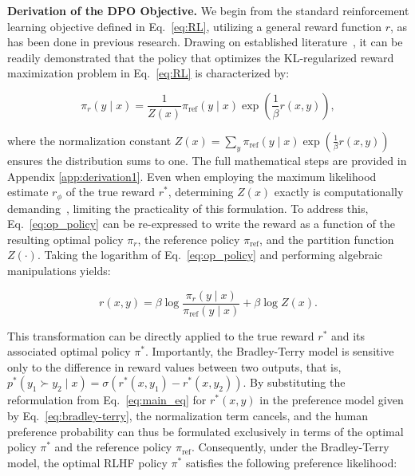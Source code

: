 \textbf{Derivation of the DPO Objective.} We begin from the standard reinforcement learning objective defined in Eq.~\ref{eq:RL}, utilizing a general reward function $r$, as has been done in previous research. Drawing on established literature~\citep{peters2007reinforcement, peng2019advantage, korbak2022reinforcement, go2023aligning}, it can be readily demonstrated that the policy that optimizes the KL-regularized reward maximization problem in Eq.~\ref{eq:RL} is characterized by:

\begin{equation}\label{eq:op_policy}
    \pi_r(y\mid x) = \frac{1}{Z(x)}\pi_\text{ref}(y\mid x)\exp\left(\frac{1}{\beta}r(x, y)\right),
\end{equation}

where the normalization constant $Z(x) =\sum_{y}\pi_\text{ref}(y\mid x)\exp\left(\frac{1}{\beta}r(x, y)\right)$ ensures the distribution sums to one. The full mathematical steps are provided in Appendix \ref{app:derivation1}. Even when employing the maximum likelihood estimate $r_\phi$ of the true reward $r^*$, determining $Z(x)$ exactly is computationally demanding~\citep{korbak2022reinforcement, go2023aligning}, limiting the practicality of this formulation. To address this, Eq.~\ref{eq:op_policy} can be re-expressed to write the reward as a function of the resulting optimal policy $\pi_r$, the reference policy $\pi_\text{ref}$, and the partition function $Z(\cdot)$. Taking the logarithm of Eq.~\ref{eq:op_policy} and performing algebraic manipulations yields:

\begin{equation}\label{eq:main_eq}
    r(x,y) =\beta \log \frac{\pi_r(y\mid x)}{\pi_\text{ref}(y\mid x)} + \beta \log Z(x).
\end{equation}

This transformation can be directly applied to the true reward $r^*$ and its associated optimal policy $\pi^*$. Importantly, the Bradley-Terry model is sensitive only to the difference in reward values between two outputs, that is, ${p^*(y_1 \succ y_2 \mid x) = \sigma(r^*(x, y_1) - r^*(x, y_2))}$. By substituting the reformulation from Eq.~\ref{eq:main_eq} for $r^*(x,y)$ in the preference model given by Eq.~\ref{eq:bradley-terry}, the normalization term cancels, and the human preference probability can thus be formulated exclusively in terms of the optimal policy $\pi^*$ and the reference policy $\pi_\text{ref}$. Consequently, under the Bradley-Terry model, the optimal RLHF policy $\pi^*$ satisfies the following preference likelihood:

